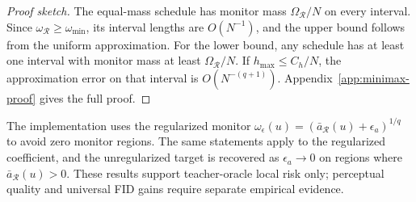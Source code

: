 \begin{proof}[Proof sketch]
The equal-mass schedule has monitor mass $\Omega_{\mathcal R}/N$ on every
interval. Since $\omega_{\mathcal R}\ge\omega_{\min}$, its interval lengths are
$O(N^{-1})$, and the upper bound follows from the uniform approximation. For
the lower bound, any schedule has at least one interval with monitor mass at
least $\Omega_{\mathcal R}/N$. If $h_{\max}\le C_h/N$, the approximation error
on that interval is $O(N^{-(q+1)})$. Appendix~\ref{app:minimax-proof} gives the
full proof.
\end{proof}

The implementation uses the regularized monitor
$\omega_\epsilon(u)=(\bar a_{\mathcal R}(u)+\epsilon_a)^{1/q}$ to avoid zero
monitor regions. The same statements apply to the regularized coefficient, and
the unregularized target is recovered as $\epsilon_a\rightarrow0$ on regions
where $\bar a_{\mathcal R}(u)>0$. These results support teacher-oracle local
risk only; perceptual quality and universal FID gains require separate
empirical evidence.
